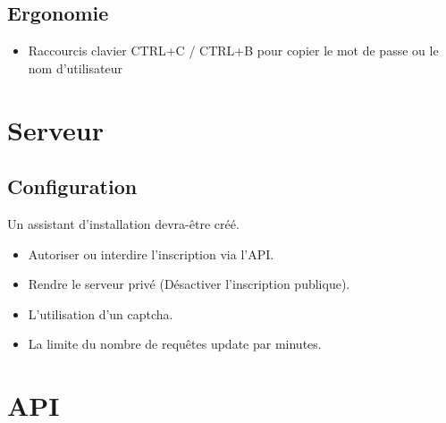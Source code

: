 \documentclass[oneside]{report}
\begin{document}
	\section{Ergonomie}{
		\begin{itemize}
			\item Raccourcis clavier CTRL+C / CTRL+B pour copier le mot de passe ou le nom d'utilisateur
		\end{itemize}
	}

	\chapter{Serveur}
	\section{Configuration}{
		\par Un assistant d'installation devra-être créé.
		\begin{itemize}
			\item Autoriser ou interdire l'inscription via l'API.
			\item Rendre le serveur privé (Désactiver l'inscription publique).
			\item L'utilisation d'un captcha.
			\item La limite du nombre de requêtes update par minutes.
		\end{itemize}
	}

	\chapter{API}
\end{document}
